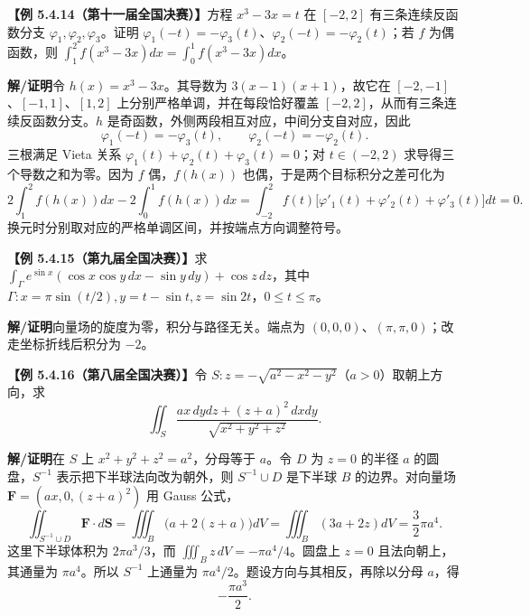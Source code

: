 \documentclass[UTF8,a4paper,11pt]{ctexart}
\newcommand{\ex}[1]{\par\medskip\noindent\textbf{【例 #1】}\;}
\newcommand{\sol}{\par\noindent\textbf{解/证明}\;}
\begin{document}
\ex{5.4.14（第十一届全国决赛）}方程 $x^3-3x=t$ 在 $[-2,2]$ 有三条连续反函数分支 $\varphi_1,\varphi_2,\varphi_3$。证明 $\varphi_1(-t)=-\varphi_3(t)$、$\varphi_2(-t)=-\varphi_2(t)$；若 $f$ 为偶函数，则 $\int_1^2f(x^3-3x)dx=\int_0^1f(x^3-3x)dx$。
\sol 令 $h(x)=x^3-3x$。其导数为 $3(x-1)(x+1)$，故它在 $[-2,-1]$、$[-1,1]$、$[1,2]$ 上分别严格单调，并在每段恰好覆盖 $[-2,2]$，从而有三条连续反函数分支。$h$ 是奇函数，外侧两段相互对应，中间分支自对应，因此
\[\varphi_1(-t)=-\varphi_3(t),\qquad\varphi_2(-t)=-\varphi_2(t).\]
三根满足 Vieta 关系 $\varphi_1(t)+\varphi_2(t)+\varphi_3(t)=0$；对 $t\in(-2,2)$ 求导得三个导数之和为零。因为 $f$ 偶，$f(h(x))$ 也偶，于是两个目标积分之差可化为
\[2\int_1^2f(h(x))dx-2\int_0^1f(h(x))dx
=\int_{-2}^2f(t)\bigl[\varphi'_1(t)+\varphi'_2(t)+\varphi'_3(t)\bigr]dt=0.\]
换元时分别取对应的严格单调区间，并按端点方向调整符号。
\ex{5.4.15（第九届全国决赛）}求 $\int_\Gamma e^{\sin x}(\cos x\cos y\,dx-\sin y\,dy)+\cos z\,dz$，其中 $\Gamma:x=\pi\sin(t/2),y=t-\sin t,z=\sin2t$，$0\le t\le\pi$。
\sol 向量场的旋度为零，积分与路径无关。端点为 $(0,0,0)$、$(\pi,\pi,0)$；改走坐标折线后积分为 $-2$。
\ex{5.4.16（第八届全国决赛）}令 $S:z=-\sqrt{a^2-x^2-y^2}$（$a>0$）取朝上方向，求
\[\iint_S\frac{ax\,dydz+(z+a)^2\,dxdy}{\sqrt{x^2+y^2+z^2}}.\]
\sol 在 $S$ 上 $x^2+y^2+z^2=a^2$，分母等于 $a$。令 $D$ 为 $z=0$ 的半径 $a$ 的圆盘，$S^{-1}$ 表示把下半球法向改为朝外，则 $S^{-1}\cup D$ 是下半球 $B$ 的边界。对向量场 $\mathbf F=(ax,0,(z+a)^2)$ 用 Gauss 公式，
\[\iint_{S^{-1}\cup D}\mathbf F\cdot d\mathbf S
=\iiint_B\bigl(a+2(z+a)\bigr)dV
=\iiint_B(3a+2z)dV=\frac32\pi a^4.\]
这里下半球体积为 $2\pi a^3/3$，而 $\iiint_B z\,dV=-\pi a^4/4$。圆盘上 $z=0$ 且法向朝上，其通量为 $\pi a^4$。所以 $S^{-1}$ 上通量为 $\pi a^4/2$。题设方向与其相反，再除以分母 $a$，得
\[\boxed{-\frac{\pi a^3}{2}}.\]
\end{document}
